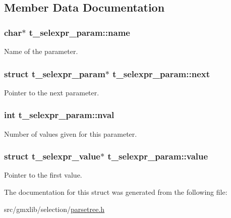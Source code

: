 \subsection{\-Member \-Data \-Documentation}
\hypertarget{structt__selexpr__param_a0522622f9261b8bc183b4813a15f3f56}{
\subsubsection[{name}]{\setlength{\rightskip}{0pt plus 5cm}char$\ast$ {\bf t\-\_\-selexpr\-\_\-param\-::name}}}\label{structt__selexpr__param_a0522622f9261b8bc183b4813a15f3f56}
\-Name of the parameter. \hypertarget{structt__selexpr__param_a81a614b1b510f114278bb6de496e8a16}{
\subsubsection[{next}]{\setlength{\rightskip}{0pt plus 5cm}struct {\bf t\-\_\-selexpr\-\_\-param}$\ast$ {\bf t\-\_\-selexpr\-\_\-param\-::next}}}\label{structt__selexpr__param_a81a614b1b510f114278bb6de496e8a16}
\-Pointer to the next parameter. \hypertarget{structt__selexpr__param_a53d38ffb62c39877c3033b4b43a1358a}{
\subsubsection[{nval}]{\setlength{\rightskip}{0pt plus 5cm}int {\bf t\-\_\-selexpr\-\_\-param\-::nval}}}\label{structt__selexpr__param_a53d38ffb62c39877c3033b4b43a1358a}
\-Number of values given for this parameter. \hypertarget{structt__selexpr__param_a7d4a06d62902cdb7fe32e313b0186695}{
\subsubsection[{value}]{\setlength{\rightskip}{0pt plus 5cm}struct {\bf t\-\_\-selexpr\-\_\-value}$\ast$ {\bf t\-\_\-selexpr\-\_\-param\-::value}}}\label{structt__selexpr__param_a7d4a06d62902cdb7fe32e313b0186695}
\-Pointer to the first value. 

\-The documentation for this struct was generated from the following file\-:\begin{DoxyCompactItemize}
\item 
src/gmxlib/selection/\hyperlink{parsetree_8h}{parsetree.\-h}\end{DoxyCompactItemize}
